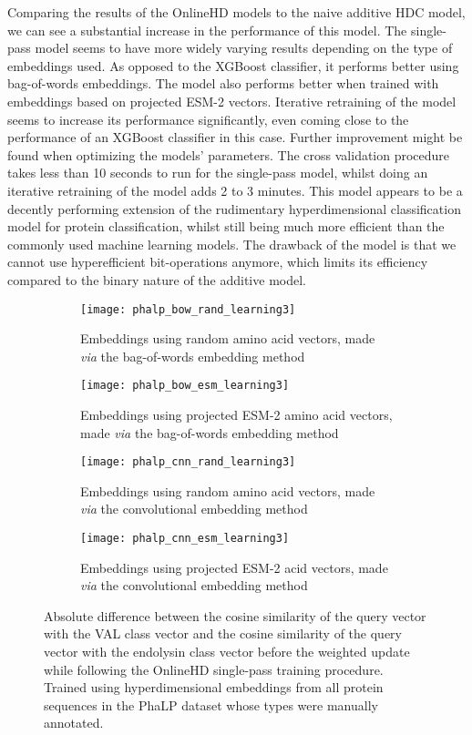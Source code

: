 Comparing the results of the OnlineHD models to the naive additive HDC model, we can see a substantial increase in the performance of this model. The single-pass model seems to have more widely varying results depending on the type of embeddings used. As opposed to the XGBoost classifier, it performs better using bag-of-words embeddings. The model also performs better when trained with embeddings based on projected ESM-2 vectors. Iterative retraining of the model seems to increase its performance significantly, even coming close to the performance of an XGBoost classifier in this case. Further improvement might be found when optimizing the models' parameters. The cross validation procedure takes less than 10 seconds to run for the single-pass model, whilst doing an iterative retraining of the model adds 2 to 3 minutes. This model appears to be a decently performing extension of the rudimentary hyperdimensional classification model for protein classification, whilst still being much more efficient than the commonly used machine learning models. The drawback of the model is that we cannot use hyperefficient bit-operations anymore, which limits its efficiency compared to the binary nature of the additive model.

\begin{figure}[ht!]
    \centering
    \begin{subfigure}{0.48\textwidth}
        \texttt{[image: phalp\_bow\_rand\_learning3]}
        \caption{Embeddings using random amino acid vectors, made \textit{via} the bag-of-words embedding method}
        \label{fig:subfig-a2}
    \end{subfigure}
    \hfill
    \begin{subfigure}{0.48\textwidth}
        \texttt{[image: phalp\_bow\_esm\_learning3]}
        \caption{Embeddings using projected ESM-2 amino acid vectors, made \textit{via} the bag-of-words embedding method}
        \label{fig:subfig-b2}
    \end{subfigure}
    
    \begin{subfigure}{0.48\textwidth}
        \texttt{[image: phalp\_cnn\_rand\_learning3]}
        \caption{Embeddings using random amino acid vectors, made \textit{via} the convolutional embedding method}
        \label{fig:subfig-c2}
    \end{subfigure}
    \hfill
    \begin{subfigure}{0.48\textwidth}
        \texttt{[image: phalp\_cnn\_esm\_learning3]}
        \caption{Embeddings using projected ESM-2 acid vectors, made \textit{via} the convolutional embedding method}
        \label{fig:subfig-d2}
    \end{subfigure}
    \caption{Absolute difference between the cosine similarity of the query vector with the VAL class vector and the cosine similarity of the query vector with the endolysin class vector before the weighted update while following the OnlineHD single-pass training procedure. Trained using hyperdimensional embeddings from all protein sequences in the PhaLP dataset whose types were manually annotated.}
    \label{fig:main2}
\end{figure}

